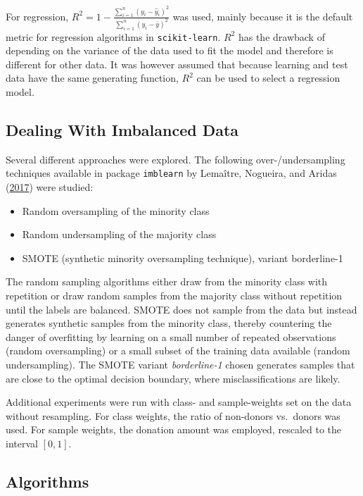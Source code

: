 \documentclass[
  11pt,
  a4paper,
  DIV=12,captions=tableheading,oneside,titlepage]{scrbook}
\providecommand{\tightlist}{%
  \setlength{\itemsep}{0pt}\setlength{\parskip}{0pt}}
\begin{document}
For regression, \(R^2 = 1- \frac{\sum_{i=1}^n(y_i-\hat{y}_i)^2}{\sum_{i=1}^n(y_i-\bar{y})^2}\) was used, mainly because it is the default metric for regression algorithms in \texttt{scikit-learn}. \(R^2\) has the drawback of depending on the variance of the data used to fit the model and therefore is different for other data. It was however assumed that because learning and test data have the same generating function, \(R^2\) can be used to select a regression model.

\hypertarget{imblearn}{%
\subsection{Dealing With Imbalanced Data}\label{imblearn}}

Several different approaches were explored. The following over-/undersampling techniques available in package \texttt{imblearn} by Lemaître, Nogueira, and Aridas (\protect\hyperlink{ref-lemaitre2017imblearn}{2017}) were studied:

\begin{itemize}
\tightlist
\item
  Random oversampling of the minority class
\item
  Random undersampling of the majority class
\item
  SMOTE (synthetic minority oversampling technique), variant borderline-1
\end{itemize}

The random sampling algorithms either draw from the minority class with repetition or draw random samples from the majority class without repetition until the labels are balanced. SMOTE does not sample from the data but instead generates synthetic samples from the minority class, thereby countering the danger of overfitting by learning on a small number of repeated observations (random oversampling) or a small subset of the training data available (random undersampling). The SMOTE variant \emph{borderline-1} chosen generates samples that are close to the optimal decision boundary, where misclassifications are likely.

Additional experiments were run with class- and sample-weights set on the data without resampling. For class weights, the ratio of non-donors vs.~donors was used. For sample weights, the donation amount was employed, rescaled to the interval \([0,1]\).

\hypertarget{algorithms}{%
\subsection{Algorithms}\label{algorithms}}
\end{document}
